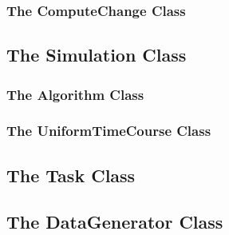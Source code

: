   \subsubsection[ComputeChange]{The ComputeChange Class}
  


 \subsection[Simulation]{The Simulation Class}
 

 \subsubsection[Algorithm]{The Algorithm Class}
 

 \subsubsection[UniformTimeCourse]{The UniformTimeCourse Class}
 


%

%


 \subsection[Task]{The Task Class}
 


 \subsection[DataGenerator]{The DataGenerator Class}
 

